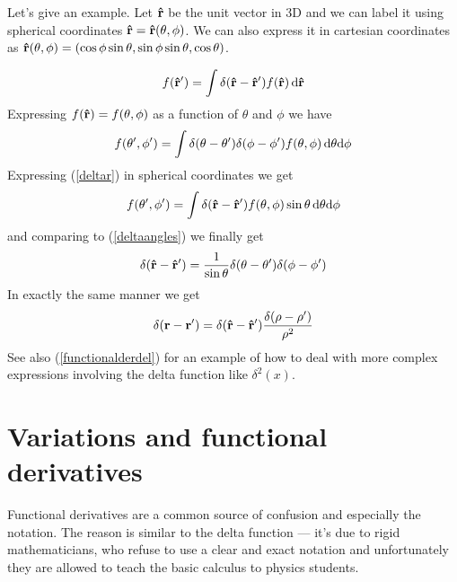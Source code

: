 Let's give an example. Let ${\bf\hat r}$ be the unit vector in 3D and we can label it using spherical coordinates ${\bf\hat r}={\bf\hat r}(\theta,\phi)$. We can also express it in cartesian coordinates as ${\bf\hat r}(\theta,\phi)=(\cos\phi\sin\theta,\sin\phi\sin\theta,\cos\theta)$.


\begin{equation}
  f({\bf\hat r'})=\int\delta({\bf\hat r}-{\bf\hat r'})f({\bf\hat r})\,{\rm d} {\bf\hat r}  \label{deltar}
\end{equation}
Expressing $f({\bf\hat r})=f(\theta,\phi)$ as a function of $\theta$ and $\phi$ we have 
\begin{equation}
  f(\theta',\phi')=\int\delta(\theta-\theta')\delta(\phi-\phi') f(\theta,\phi)\,{\rm d}\theta{\rm d}\phi  \label{deltaangles}
\end{equation}
Expressing (\ref{deltar}) in spherical coordinates we get 
\begin{equation*}
  f(\theta',\phi')=\int\delta({\bf\hat r}-{\bf\hat r'}) f(\theta,\phi)\sin\theta\,{\rm d}\theta{\rm d}\phi
\end{equation*}
and comparing to (\ref{deltaangles}) we finally get 
\begin{equation*}
  \delta({\bf\hat r}-{\bf\hat r'})={1\over\sin\theta} \delta(\theta-\theta')\delta(\phi-\phi')
\end{equation*}
In exactly the same manner we get 
\begin{equation*}
  \delta({\bf r}-{\bf r'})=\delta({\bf\hat r}-{\bf\hat r'}) {\delta(\rho-\rho')\over\rho^2}
\end{equation*}
See also (\ref{functionalderdel}) for an example of how to deal with more complex expressions involving the delta function like $\delta^2(x)$.

\section{Variations and functional derivatives}

Functional derivatives are a common source of confusion and especially the notation. The reason is similar to the delta function --- it's due to rigid mathematicians, who refuse to use a clear and exact notation and unfortunately they are allowed to teach the basic calculus to physics students.

